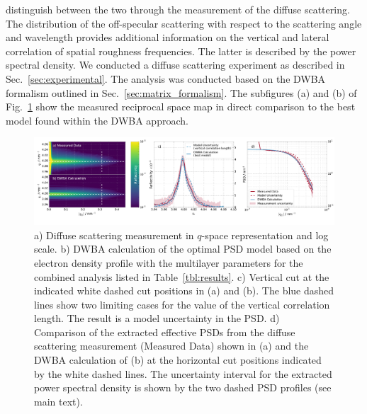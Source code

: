 distinguish between the two through the measurement of the diffuse scattering. 
The distribution of the off-specular scattering with respect to the scattering 
angle and wavelength provides additional information on the vertical and 
lateral correlation of spatial roughness frequencies. The latter is described 
by the power spectral density. We conducted a diffuse scattering experiment as 
described in Sec.~\ref{sec:experimental}. The analysis was conducted based on 
the DWBA formalism outlined in Sec.~\ref{sec:matrix_formalism}. The subfigures 
(a) and (b) of Fig.~\ref{fig:diffuse_meas} show the measured reciprocal space 
map in direct comparison to the best model found within the DWBA approach.
\onecolumn
\begin{figure}[htbp]
  \centering
  \includegraphics[width=\textwidth]{images/diffuse_incl_psd}
  \caption{a) Diffuse scattering measurement in $q$-space representation and 
log scale. b) DWBA calculation of the optimal PSD model based on the electron 
density profile with the multilayer parameters for the combined analysis listed 
in Table~\ref{tbl:results}. c) Vertical cut at the indicated white dashed cut 
positions in (a) and (b). The blue dashed lines show two limiting cases for the 
value of the vertical correlation length. The result is a model uncertainty in 
the PSD. d) Comparison of the extracted effective PSDs from the diffuse 
scattering measurement (Measured Data) shown in (a) and the DWBA calculation of 
(b) at the horizontal cut positions indicated by the white dashed lines. The 
uncertainty interval for the extracted power spectral density is shown by the 
two dashed PSD profiles (see main text).}
  \label{fig:diffuse_meas}
\end{figure}

